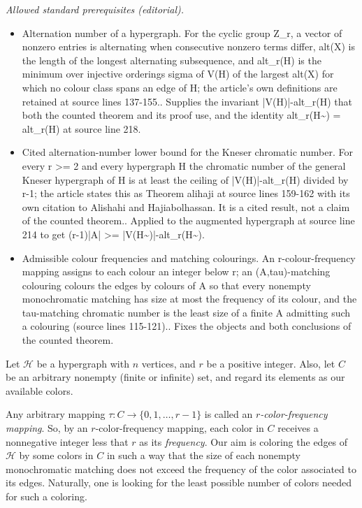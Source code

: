 \documentclass[11pt]{amsart}
\theoremstyle{definition}
\begin{document}
\noindent\textit{Allowed standard prerequisites (editorial).}\begin{itemize}
\item Alternation number of a hypergraph. For the cyclic group Z\_r, a vector of nonzero entries is alternating when consecutive nonzero terms differ, alt(X) is the length of the longest alternating subsequence, and alt\_r(H) is the minimum over injective orderings sigma of V(H) of the largest alt(X) for which no colour class spans an edge of H; the article's own definitions are retained at source lines 137-155.. Supplies the invariant |V(H)|-alt\_r(H) that both the counted theorem and its proof use, and the identity alt\_r(H\textasciitilde{}) = alt\_r(H) at source line 218.
\item Cited alternation-number lower bound for the Kneser chromatic number. For every r >= 2 and every hypergraph H the chromatic number of the general Kneser hypergraph of H is at least the ceiling of |V(H)|-alt\_r(H) divided by r-1; the article states this as Theorem alihaji at source lines 159-162 with its own citation to Alishahi and Hajiabolhassan. It is a cited result, not a claim of the counted theorem.. Applied to the augmented hypergraph at source line 214 to get (r-1)|A| >= |V(H\textasciitilde{})|-alt\_r(H\textasciitilde{}).
\item Admissible colour frequencies and matching colourings. An r-colour-frequency mapping assigns to each colour an integer below r; an (A,tau)-matching colouring colours the edges by colours of A so that every nonempty monochromatic matching has size at most the frequency of its colour, and the tau-matching chromatic number is the least size of a finite A admitting such a colouring (source lines 115-121).. Fixes the objects and both conclusions of the counted theorem.
\end{itemize}\medskip
Let ${\mathcal H}$ be a hypergraph with $n$ vertices, and $r$ be a positive integer. Also, let $C$ be an arbitrary nonempty (finite or infinite) set, and regard its elements as our available colors.

\noindent Any arbitrary mapping $\tau: C\longrightarrow \{0,1,\ldots,r-1\}$ is called an {\it $r$-color-frequency mapping}. So, by an $r$-color-frequency mapping, each color in $C$ receives a nonnegative integer less that $r$ as its {\it frequency}. Our aim is coloring the edges of ${\mathcal H}$ by some colors in $C$ in such a way that the size of each nonempty monochromatic matching does not exceed the frequency of the color associated to its edges. Naturally, one is looking for the least possible number of colors needed for such a coloring.
\end{document}
